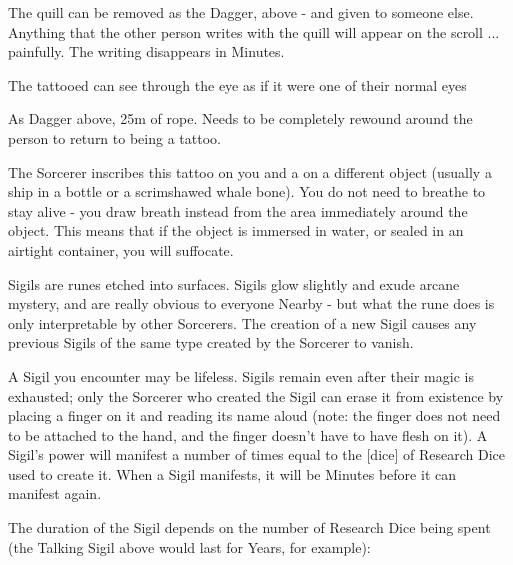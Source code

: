 {The quill can be removed as the Dagger, above - and given to someone else.  Anything that the other person writes with the quill will appear on the scroll ... painfully.  The writing disappears in Minutes.


The tattooed can see through the eye as if it were one of their normal eyes


As Dagger above, 25m of rope. Needs to be completely rewound around the person to return to being a tattoo.



The Sorcerer inscribes this tattoo on you and a  on a different object (usually a ship in a bottle or a scrimshawed whale bone).  You do not need to breathe to stay alive - you draw breath instead from the area immediately around the object.  This means that if the object is immersed in water, or sealed in an airtight container, you will suffocate.




Sigils are runes etched into surfaces.  Sigils glow slightly and exude arcane mystery, and are really obvious to everyone Nearby - but what the rune does is only interpretable by other Sorcerers.  The creation of a new Sigil causes any previous Sigils of the same type created by the Sorcerer to vanish.

A Sigil you encounter may be lifeless.  Sigils remain even after their magic is exhausted; only the Sorcerer who created the Sigil can erase it from existence by placing a finger on it and reading its name aloud (note: the finger does not need to be attached to the hand, and the finger doesn't have to have flesh on it).  A Sigil's power will manifest a number of times equal to the [dice] of Research Dice used to create it.  When a Sigil manifests, it will be Minutes before it can manifest again.


The duration of the Sigil depends on the number of Research Dice being spent (the Talking Sigil above would last for Years, for example):

}
